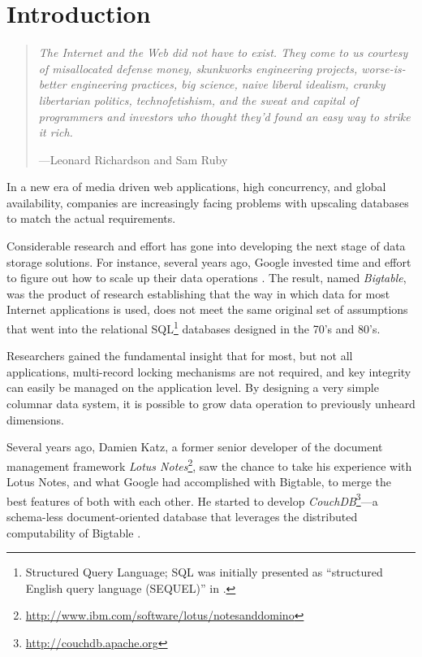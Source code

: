 \chapter{Introduction}

\begin{quote}
{\itshape
The Internet and the Web did not have to exist. They come to us courtesy of misallocated defense money, skunkworks engineering projects, worse-is-better engineering practices, big science, naive liberal idealism, cranky libertarian politics, technofetishism, and the sweat and capital of programmers and investors who thought they'd found an easy way to strike it rich.
}

\hspace{1em}---Leonard Richardson and Sam Ruby \cite[p.~xviii]{RR07}\\
\end{quote}

\noindent
In a new era of media driven web applications, high concurrency, and global availability, companies are increasingly facing problems with upscaling databases to match the actual requirements.

Considerable research and effort has gone into developing the next stage of data storage solutions. For instance, several years ago, Google invested time and effort to figure out how to scale up their data operations \cite{CDG+08}. The result, named \emph{Bigtable}, was the product of research establishing that the way in which data for most Internet applications is used, does not meet the same original set of assumptions that went into the relational SQL\footnote{Structured Query Language; SQL was initially presented as ``structured English query language (SEQUEL)'' in \cite{CB74}.} databases designed in the 70's and 80's.

Researchers gained the fundamental insight that for most, but not all applications, multi-record locking mechanisms are not required, and key integrity can easily be managed on the application level. By designing a very simple columnar data system, it is possible to grow data operation to previously unheard dimensions.

Several years ago, Damien Katz, a former senior developer of the document management framework \emph{Lotus Notes}\footnote{\url{http://www.ibm.com/software/lotus/notesanddomino}}, saw the chance to take his experience with Lotus Notes, and what Google had accomplished with Bigtable, to merge the best features of both with each other. He started to develop \emph{CouchDB}\footnote{\url{http://couchdb.apache.org}}---a schema-less document-oriented database that leverages the distributed computability of Bigtable \cite[p.~8]{Cha09}.\\

